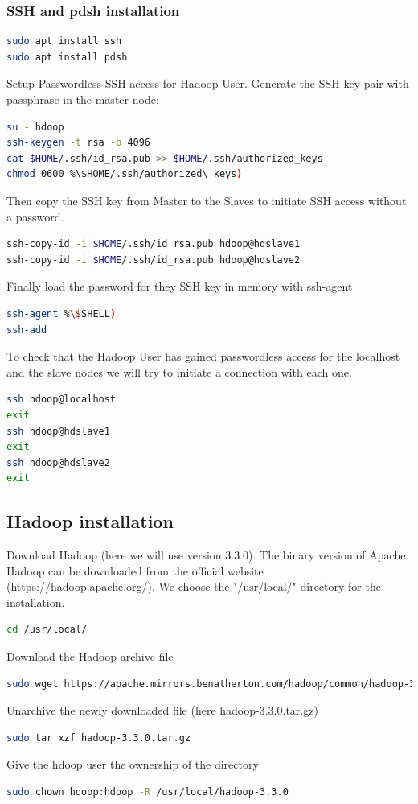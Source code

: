 \documentclass[12pt,english]{book}
\begin{document}
\subsubsection{SSH and pdsh installation}


\begin{lstlisting}[language=bash, frame=single]
sudo apt install ssh
sudo apt install pdsh
\end{lstlisting}

Setup Passwordless SSH access for Hadoop User.
Generate the SSH key pair with passphrase in the master node:
\begin{lstlisting}[language=bash, frame=single]
su - hdoop
ssh-keygen -t rsa -b 4096
cat $HOME/.ssh/id_rsa.pub >> $HOME/.ssh/authorized_keys
chmod 0600 %\$HOME/.ssh/authorized\_keys)
\end{lstlisting}
Then copy the SSH key from Master to the Slaves to initiate SSH access without a password.
\begin{lstlisting}[language=bash, frame=single]
ssh-copy-id -i $HOME/.ssh/id_rsa.pub hdoop@hdslave1
ssh-copy-id -i $HOME/.ssh/id_rsa.pub hdoop@hdslave2
\end{lstlisting}
Finally load the password for they SSH key in memory with ssh-agent
\begin{lstlisting}[language=bash, frame=single]
ssh-agent %\$SHELL)
ssh-add
\end{lstlisting}
To check that the Hadoop User has gained passwordless access for the localhost and the slave nodes we will try to initiate a connection with each one.
\begin{lstlisting}[language=bash, frame=single]
ssh hdoop@localhost
exit
ssh hdoop@hdslave1
exit
ssh hdoop@hdslave2
exit
\end{lstlisting}



\subsection{Hadoop installation}


Download Hadoop (here we will use version 3.3.0).
The binary version of Apache Hadoop can be downloaded from the official website (https://hadoop.apache.org/).
We choose the "/usr/local/" directory for the installation.
\begin{lstlisting}[language=bash, frame=single]
cd /usr/local/
\end{lstlisting}
Download the Hadoop archive file
\begin{lstlisting}[language=bash, frame=single]
sudo wget https://apache.mirrors.benatherton.com/hadoop/common/hadoop-3.3.0/hadoop-3.3.0.tar.gz
\end{lstlisting}
Unarchive the newly downloaded file (here hadoop-3.3.0.tar.gz)
\begin{lstlisting}[language=bash, frame=single]
sudo tar xzf hadoop-3.3.0.tar.gz
\end{lstlisting}
Give the hdoop user the ownership of the directory
\begin{lstlisting}[language=bash, frame=single]
sudo chown hdoop:hdoop -R /usr/local/hadoop-3.3.0
\end{lstlisting}
\end{document}
